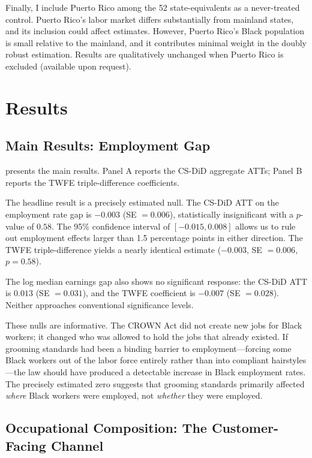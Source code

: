 \documentclass[12pt]{article}
\begin{document}
Finally, I include Puerto Rico among the 52 state-equivalents as a never-treated control. Puerto Rico's labor market differs substantially from mainland states, and its inclusion could affect estimates. However, Puerto Rico's Black population is small relative to the mainland, and it contributes minimal weight in the doubly robust estimation. Results are qualitatively unchanged when Puerto Rico is excluded (available upon request).

\section{Results}\label{sec:results}

\subsection{Main Results: Employment Gap}

 presents the main results. Panel A reports the CS-DiD aggregate ATTs; Panel B reports the TWFE triple-difference coefficients.

The headline result is a precisely estimated null. The CS-DiD ATT on the employment rate gap is $-0.003$ (SE $= 0.006$), statistically insignificant with a $p$-value of $0.58$. The 95\% confidence interval of $[-0.015, 0.008]$ allows us to rule out employment effects larger than 1.5 percentage points in either direction. The TWFE triple-difference yields a nearly identical estimate ($-0.003$, SE $= 0.006$, $p = 0.58$).

The log median earnings gap also shows no significant response: the CS-DiD ATT is $0.013$ (SE $= 0.031$), and the TWFE coefficient is $-0.007$ (SE $= 0.028$). Neither approaches conventional significance levels.

These nulls are informative. The CROWN Act did not create new jobs for Black workers; it changed who was allowed to hold the jobs that already existed. If grooming standards had been a binding barrier to employment---forcing some Black workers out of the labor force entirely rather than into compliant hairstyles---the law should have produced a detectable increase in Black employment rates. The precisely estimated zero suggests that grooming standards primarily affected \textit{where} Black workers were employed, not \textit{whether} they were employed.



\subsection{Occupational Composition: The Customer-Facing Channel}
\end{document}
